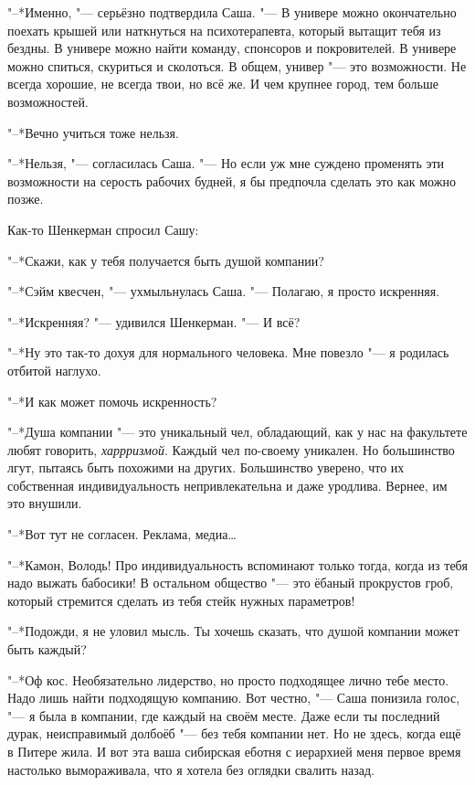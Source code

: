 "--*Именно, "--- серьёзно подтвердила Саша.
"--- В универе можно окончательно поехать крышей или наткнуться на психотерапевта, который вытащит тебя из бездны.
В универе можно найти команду, спонсоров и покровителей.
В универе можно спиться, скуриться и сколоться.
В общем, универ "--- это возможности.
Не всегда хорошие, не всегда твои, но всё же.
И чем крупнее город, тем больше возможностей.

"--*Вечно учиться тоже нельзя.

"--*Нельзя, "--- согласилась Саша.
"--- Но если уж мне суждено променять эти возможности на серость рабочих будней, я бы предпочла сделать это как можно позже.

Как-то Шенкерман спросил Сашу:

"--*Скажи, как у тебя получается быть душой компании?

"--*Сэйм квесчен, "--- ухмыльнулась Саша.
"--- Полагаю, я просто искренняя.

"--*Искренняя? "--- удивился Шенкерман.
"--- И всё?

"--*Ну это так-то дохуя для нормального человека.
Мне повезло "--- я родилась отбитой наглухо.

"--*И как может помочь искренность?

"--*Душа компании "--- это уникальный чел, обладающий, как у нас на факультете любят говорить, \emph{харрризмой}.
Каждый чел по-своему уникален.
Но большинство лгут, пытаясь быть похожими на других.
Большинство уверено, что их собственная индивидуальность непривлекательна и даже уродлива.
Вернее, им это внушили.

"--*Вот тут не согласен.
Реклама, медиа\dots{}

"--*Камон, Володь!
Про индивидуальность вспоминают только тогда, когда из тебя надо выжать бабосики!
В остальном общество "--- это ёбаный прокрустов гроб, который стремится сделать из тебя стейк нужных параметров!

"--*Подожди, я не уловил мысль.
Ты хочешь сказать, что душой компании может быть каждый?

"--*Оф кос.
Необязательно лидерство, но просто подходящее лично тебе место.
Надо лишь найти подходящую компанию.
Вот честно, "--- Саша понизила голос, "--- я была в компании, где каждый на своём месте.
Даже если ты последний дурак, неисправимый долбоёб "--- без тебя компании нет.
Но не здесь, когда ещё в Питере жила.
И вот эта ваша сибирская еботня с иерархией меня первое время настолько вымораживала, что я хотела без оглядки свалить назад.

